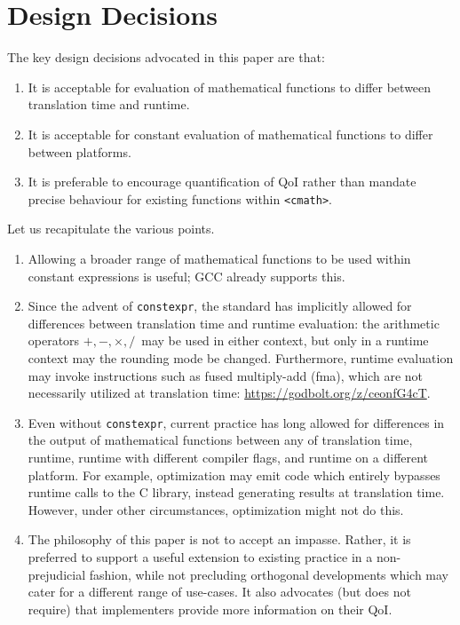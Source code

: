 \documentclass[prd,twocolumn,amsmath,amssymb,nofootinbib,eqsecnum]{revtex4-1}
\newcommand{\constexpr}{\code{constexpr}\xspace}
\newcommand{\code}[1]{{\tt #1}}
\newcommand{\header}[1]{{\tt <#1>}}
\newcommand{\cmath}{\header{cmath}}
\newcommand{\Operators}{\ensuremath{+,-,\times,/}}
\begin{document}
\section{Design Decisions}

The key design decisions advocated in this paper are that:
\begin{enumerate}
	\item It is acceptable for evaluation of mathematical functions to differ between translation time and runtime.

	\item It is acceptable for constant evaluation of mathematical functions to differ between platforms.
	
	\item It is preferable to encourage quantification of QoI rather than mandate precise behaviour for existing functions within \cmath.
\end{enumerate}

Let us recapitulate the various points.

\begin{enumerate}
	\item Allowing a broader range of mathematical functions to be used within constant expressions is useful; GCC already supports this.
	
	\item Since the advent of \constexpr, the standard has implicitly allowed for differences between translation time and runtime evaluation: the arithmetic operators \Operators\ may be used in either context, but only in a runtime context may the rounding mode be changed. Furthermore, runtime evaluation may invoke instructions such as fused multiply-add (fma), which are not necessarily utilized at translation time: \href{https://godbolt.org/z/ceonfG4cT}{https://godbolt.org/z/ceonfG4cT}.
	
	\item Even without \constexpr, current practice has long allowed for differences in the output of mathematical functions between any of translation time, runtime, runtime with different compiler flags, and runtime on a different platform. For example, optimization may emit code which entirely bypasses runtime calls to the C library, instead generating results at translation time. However, under other circumstances, optimization might not do this.
	
	\item The philosophy of this paper is not to accept an impasse. Rather, it is preferred to support
	a useful extension to existing practice in a non-prejudicial fashion, while not precluding 
	orthogonal developments which may cater for a different range of use-cases. It also advocates
	(but does not require) that implementers provide more information on their QoI.
\end{enumerate}
\end{document}
